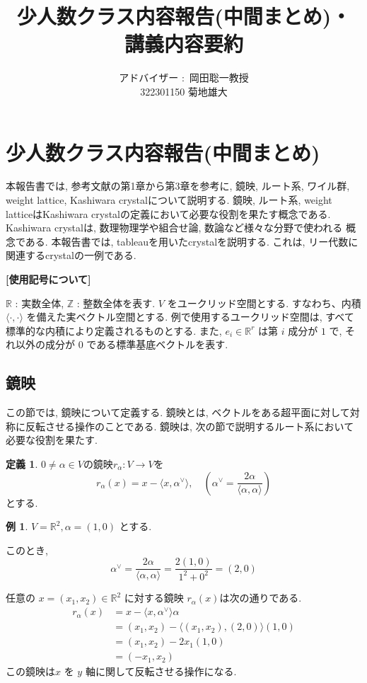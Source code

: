 \documentclass[
  a4paper, 
  12pt,
  ja=standard,
  xelatex,
  left=30truemm,
  right=30truemm,
  titlepage 
]{bxjsarticle}
\title{少人数クラス内容報告(中間まとめ)・\\ 講義内容要約}
\author{アドバイザー $\colon$ 岡田聡一教授 \\[50pt]
322301150 \quad 菊地雄大}
\date{}
\theoremstyle{definition}
\newtheorem{df}{定義}
\newtheorem*{ex}{例}
\begin{document}
\maketitle
%
%
\section{少人数クラス内容報告(中間まとめ)}
  本報告書では, 参考文献\cite{b1}の第1章から第3章を参考に, 鏡映, ルート系, ワイル群, weight lattice, Kashiwara crystalについて説明する.
  鏡映, ルート系, weight latticeはKashiwara crystalの定義において必要な役割を果たす概念である. Kashiwara crystalは, 数理物理学や組合せ論, 数論など様々な分野で使われる
  概念である. 本報告書では, tableauを用いたcrystalを説明する. これは, リー代数に関連するcrystalの一例である. 
  \begin{center} \textbf{[使用記号について]} \end{center}

  $\mathbb{R}$ : 実数全体, $\mathbb{Z}$ : 整数全体を表す.
  $V$ をユークリッド空間とする. すなわち、内積 $\langle \cdot, \cdot \rangle$ を備えた実ベクトル空間とする. 例で使用するユークリッド空間は, すべて標準的な内積により定義されるものとする.
  また, $e_i \in \mathbb{R}^r$ は第 $i$ 成分が $1$ で, それ以外の成分が $0$ である標準基底ベクトルを表す.
%
\subsection{鏡映}
  この節では, 鏡映について定義する. 鏡映とは, ベクトルをある超平面に対して対称に反転させる操作のことである. 鏡映は, 次の節で説明するルート系において必要な役割を果たす.
\bigskip

\begin{df}
  $0 \neq  \alpha \in V $の鏡映$r_\alpha: V \to V $を
  \[
  r_\alpha (x) = x - \langle x , \alpha^{ \vee } \rangle, \quad \left( \alpha^{ \vee } = \frac{2 \alpha}{\langle \alpha, \alpha \rangle} \right)
  \]
  とする.
\end{df}

\begin{ex}
  $V = \mathbb{R}^2, \alpha = (1, 0)$ とする.
  
  このとき, 
  \[
  \alpha^{\vee} = \frac{2 \alpha}{\langle \alpha, \alpha \rangle} = \frac{2 (1, 0)}{1^2 + 0^2} = (2, 0)
  \]

  任意の $x = (x_1, x_2) \in \mathbb{R}^2$ に対する鏡映 $r_\alpha(x)$は次の通りである.
  \[
  \begin{aligned}
    r_\alpha(x) &= x - \langle x, \alpha^{\vee} \rangle \alpha \\
    &= (x_1, x_2) - \langle (x_1, x_2), (2, 0) \rangle (1, 0) \\
    &= (x_1, x_2) - 2x_1 (1, 0) \\
    &= (-x_1, x_2)
  \end{aligned}
  \]
  この鏡映は$x$ を $y$ 軸に関して反転させる操作になる.
\end{ex}
\end{document}
